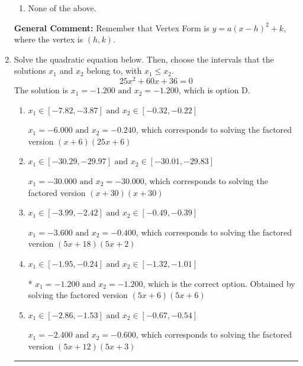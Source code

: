 \documentclass{extbook}[14pt]
\newcommand{\litem}[1]{\item #1

\rule{\textwidth}{0.4pt}}
\begin{document}
\begin{enumerate}
{\begin{enumerate}[label=\Alph*.]
\item None of the above.\end{enumerate}
\textbf{General Comment:} Remember that Vertex Form is $y = a(x-h)^2+k$, where the vertex is $(h, k)$.
}
\litem{
Solve the quadratic equation below. Then, choose the intervals that the solutions $x_1$ and $x_2$ belong to, with $x_1 \leq x_2$.
\[ 25x^{2} +60 x + 36 = 0 \]
The solution is \( x_1 = -1.200 \text{ and } x_2 = -1.200 \), which is option D.\begin{enumerate}[label=\Alph*.]
\item \( x_1 \in [-7.82, -3.87] \text{ and } x_2 \in [-0.32, -0.22] \)

$x_1 = -6.000 \text{ and } x_2 = -0.240$, which corresponds to solving the factored version $(x + 6)(25x + 6)$
\item \( x_1 \in [-30.29, -29.97] \text{ and } x_2 \in [-30.01, -29.83] \)

$x_1 = -30.000 \text{ and } x_2 = -30.000$, which corresponds to solving the factored version $(x + 30)(x + 30)$
\item \( x_1 \in [-3.99, -2.42] \text{ and } x_2 \in [-0.49, -0.39] \)

$x_1 = -3.600 \text{ and } x_2 = -0.400$, which corresponds to solving the factored version $(5x + 18)(5x + 2)$
\item \( x_1 \in [-1.95, -0.24] \text{ and } x_2 \in [-1.32, -1.01] \)

* $x_1 = -1.200 \text{ and } x_2 = -1.200$, which is the correct option. Obtained by solving the factored version $(5x + 6)(5x + 6)$
\item \( x_1 \in [-2.86, -1.53] \text{ and } x_2 \in [-0.67, -0.54] \)

$x_1 = -2.400 \text{ and } x_2 = -0.600$, which corresponds to solving the factored version $(5x + 12)(5x + 3)$
\end{enumerate}

}
\end{enumerate}
\end{document}
